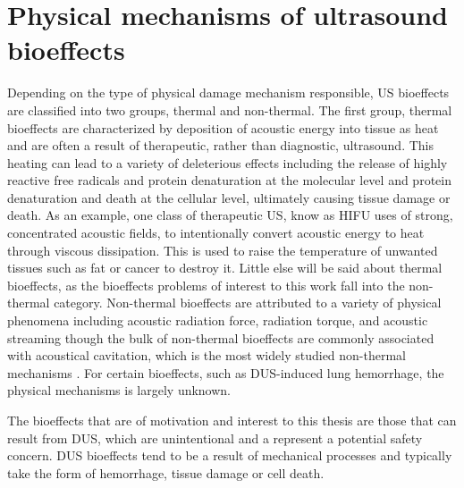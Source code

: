\section{Physical mechanisms of ultrasound bioeffects} \label{sec:bioeffects_mechanisms}%
%
Depending on the type of physical damage mechanism responsible,
\ac{US} bioeffects are classified into two groups, thermal and
non-thermal. The first group, thermal bioeffects are characterized by
deposition of acoustic energy into tissue as heat and are often a
result of therapeutic, rather than diagnostic, ultrasound. This
heating can lead to a variety of deleterious effects including the
release of highly reactive free radicals and protein denaturation at
the molecular level and protein denaturation and death at the cellular
level, ultimately causing tissue damage or death. As an example, one
class of therapeutic \ac{US}, know as \ac{HIFU} uses of strong,
concentrated acoustic fields, to intentionally convert acoustic energy
to heat through viscous dissipation. This is used to raise the
temperature of unwanted tissues such as fat or cancer to destroy
it. Little else will be said about thermal bioeffects, as the
bioeffects problems of interest to this work fall into the non-thermal
category. Non-thermal bioeffects are attributed to a variety of
physical phenomena including acoustic radiation force, radiation
torque, and acoustic streaming though the bulk of non-thermal
bioeffects are commonly associated with acoustical cavitation, which
is the most widely studied non-thermal mechanisms
\citep{Dalecki2004}. For certain bioeffects, such as \ac{DUS}-induced
lung hemorrhage, the physical mechanisms is largely unknown.

The bioeffects that are of motivation and interest to this thesis are
those that can result from \ac{DUS}, which are unintentional
and a represent a potential safety concern. \ac{DUS} bioeffects tend
to be a result of mechanical processes and typically take the form of
hemorrhage, tissue damage or cell death. 

